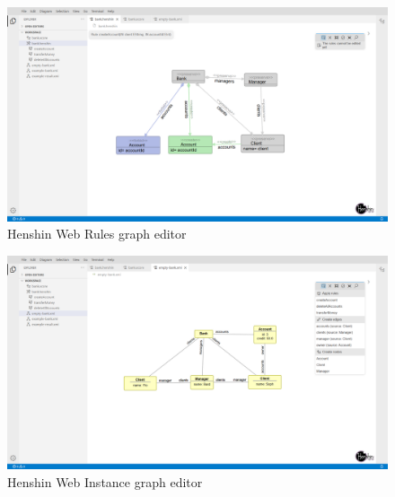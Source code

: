 \documentclass[conference,onecolumn]{IEEEtran}
\begin{document}
  \begin{figure}[H]
    \centering
    \includegraphics[width=1\textwidth]{rule-ui}
    \caption{Henshin Web Rules graph editor}
    \label{fig:rule-ui}
  \end{figure}

  \begin{figure}[H]
    \centering
    \includegraphics[width=1\textwidth]{xmi-ui}
    \caption{Henshin Web Instance graph editor}
    \label{fig:xmi-ui}
  \end{figure}



  
  \printbibliography
\end{document}
